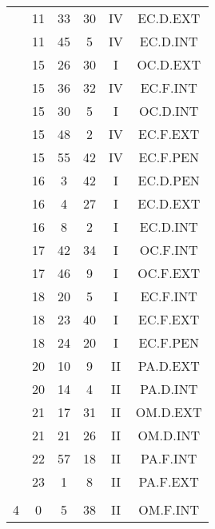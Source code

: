 \documentclass[12pt, a4paper]{article}
\begin{document}
\begin{multicols}{3}
{\begin{tabular}{c c c c c c}
	 	 	 	 & 11 & 33 & 30 & IV & EC.D.EXT\\%
	 	 	 	 & 11 & 45 & 5 & IV & EC.D.INT\\%
	 	 	 	 & 15 & 26 & 30 & I & OC.D.EXT\\%
	 	 	 	 & 15 & 36 & 32 & IV & EC.F.INT\\%
	 	 	 	 & 15 & 30 & 5 & I & OC.D.INT\\%
	 	 	 	 & 15 & 48 & 2 & IV & EC.F.EXT\\%
	 	 	 	 & 15 & 55 & 42 & IV & EC.F.PEN\\%
	 	 	 	 & 16 & 3 & 42 & I & EC.D.PEN\\%
	 	 	 	 & 16 & 4 & 27 & I & EC.D.EXT\\%
	 	 	 	 & 16 & 8 & 2 & I & EC.D.INT\\%
	 	 	 	 & 17 & 42 & 34 & I & OC.F.INT\\%
	 	 	 	 & 17 & 46 & 9 & I & OC.F.EXT\\%
	 	 	 	 & 18 & 20 & 5 & I & EC.F.INT\\%
	 	 	 	 & 18 & 23 & 40 & I & EC.F.EXT\\%
	 	 	 	 & 18 & 24 & 20 & I & EC.F.PEN\\%
	 	 	 	 & 20 & 10 & 9 & II & PA.D.EXT\\%
	 	 	 	 & 20 & 14 & 4 & II & PA.D.INT\\%
	 	 	 	 & 21 & 17 & 31 & II & OM.D.EXT\\%
	 	 	 	 & 21 & 21 & 26 & II & OM.D.INT\\%
	 	 	 	 & 22 & 57 & 18 & II & PA.F.INT\\%
	 	 	 	 & 23 & 1 & 8 & II & PA.F.EXT\\%
	 	 	 	 & & & & & \\%
	 	 	 	4 & 0 & 5 & 38 & II & OM.F.INT\\%

\end{tabular}}
\end{multicols}
\end{document}
